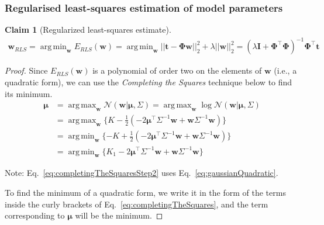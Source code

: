 \documentclass{beamer}
\newtheorem{claim}{Claim}
\DeclareMathOperator*{\argmax}{arg\,max}
\DeclareMathOperator*{\argmin}{arg\,min}
\begin{document}
\begin{frame}
    \frametitle{Regularised least-squares estimation of model parameters}
	\scriptsize
	\begin{claim}[Regularized least-squares estimate]
		\begin{align*}
			\mathbf{w}_{RLS}=\argmin_{\mathbf{w}}E_{RLS}(\mathbf{w})=\argmin_{\mathbf{w}}||\mathbf{t}-\boldsymbol{\Phi}\mathbf{w}||_2^2+\lambda||\mathbf{w}||_2^2=(\lambda\mathbf{I}+\boldsymbol{\Phi}^\intercal\boldsymbol{\Phi})^{-1}\boldsymbol{\Phi}^\intercal\mathbf{t}
		\end{align*}
	\end{claim}
	\tiny
	\begin{proof}
		Since $E_{RLS}(\mathbf{w})$ is a polynomial of order two on the elements of $\mathbf{w}$ (i.e., a quadratic form), we can use the \emph{Completing the Squares} technique below to find its minimum.
		\begin{align}
			\boldsymbol{\mu}&=\argmax_{\mathbf{w}}\mathcal{N}(\mathbf{w}|\boldsymbol{\mu},\Sigma)=\argmax_{\mathbf{w}}\log\mathcal{N}(\mathbf{w}|\boldsymbol{\mu},\Sigma)\nonumber\\
                            &=\argmax_{\mathbf{w}}\{K-\frac{1}{2}(-2\boldsymbol{\mu}^\intercal\Sigma^{-1}\mathbf{w}+\mathbf{w}\Sigma^{-1}\mathbf{w})\}\label{eq:completingTheSquaresStep2}\\
                            &=\argmin_{\mathbf{w}}\{-K+\frac{1}{2}(-2\boldsymbol{\mu}^\intercal\Sigma^{-1}\mathbf{w}+\mathbf{w}\Sigma^{-1}\mathbf{w})\}\nonumber\\
                            &=\argmin_{\mathbf{w}}\{K_1-2\boldsymbol{\mu}^\intercal\Sigma^{-1}\mathbf{w}+\mathbf{w}\Sigma^{-1}\mathbf{w}\}\label{eq:completingTheSquares}
		\end{align}

		Note: Eq.~\ref{eq:completingTheSquaresStep2} uses Eq.~\ref{eq:gaussianQuadratic}.

		To find the minimum of a quadratic form, we write it in the form of the
terms inside the curly brackets of Eq.~\ref{eq:completingTheSquares}, and the
term corresponding to $\boldsymbol{\mu}$ will be the minimum.

		\phantom\qedhere
	\end{proof}
	\normalsize
\end{frame}
\end{document}
